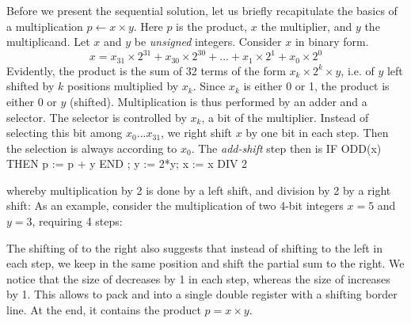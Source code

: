 Before we present the sequential solution, let us briefly recapitulate the basics of a multiplication $p \gets x \times y$. Here $p$ is the product, $x$ the multiplier, and $y$ the multiplicand. Let $x$ and $y$ be \emph{unsigned} integers. Consider $x$ in binary form.
$$x = x_{31} \times 2^{31} + x_{30} \times 2^{30} + ... + x_1 \times 2^1 + x_0 \times 2^0$$
Evidently, the product is the sum of 32 terms of the form $x_k \times 2^k \times y$, i.e. of $y$ left shifted by $k$ positions multiplied by $x_k$. Since $x_k$ is either 0 or 1, the product is either 0 or $y$ (shifted). Multiplication is thus performed by an adder and a selector. The selector is controlled by $x_k$, a bit of the multiplier. Instead of selecting this bit among $x_0...x_{31}$, we right shift $x$ by one bit in each step. Then the selection is always according to $x_0$. The \emph{add-shift} step then is
\begintt
IF ODD(x) THEN p := p + y END ;
y := 2*y; x := x DIV 2
\endtt

\noindent whereby multiplication by 2 is done by a left shift, and division by 2 by a right shift: As an example, consider the multiplication of two 4-bit integers $x = 5$ and $y = 3$, requiring 4 steps:

\medskip
{}\medskip

The shifting of  to the right also suggests that instead of shifting  to the left in each step, we keep  in the same position and shift the partial sum  to the right. We notice that the size of  decreases by 1 in each step, whereas the size of  increases by 1. This allows to pack  and  into a single double register  with a shifting border line. At the end, it contains the product $p = x \times y$.

\medskip
{}\medskip


